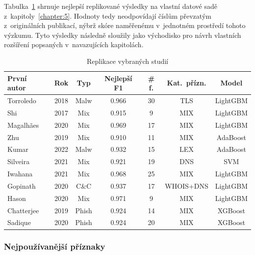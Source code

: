 Tabulka~\ref{tab:method_comparison_intext} shrnuje nejlepší replikované výsledky na vlastní datové sadě z~kapitoly~\ref{chapter:5}.  
Hodnoty tedy neodpovídají číslům převzatým z~originálních publikací, nýbrž skóre naměřenému v~jednotném prostředí tohoto výzkumu.  
Tyto výsledky následně sloužily jako východisko pro návrh vlastních rozšíření popsaných v~navazujících kapitolách.


\begin{table}[H]
  \centering
      \begin{tabular}{@{}lcccccc@{}}
        \toprule
        \textbf{První autor} & \textbf{Rok} & \textbf{Typ} &
        \textbf{Nejlepší F1} & \textbf{\# f.} &
        \textbf{Kat.\ přízn.} & \textbf{Model}\\
        \midrule
        Torroledo   & 2018 & Malw   & 0.966 & 30 & TLS           & LightGBM\\
        Shi         & 2017 & Mix    & 0.915 &  9 & MIX           & LightGBM\\
        Magalhães   & 2020 & Mix    & 0.969 & 17 & MIX           & LightGBM\\
        Zhu         & 2019 & Mix    & 0.910 & 11 & MIX           & AdaBoost\\
        Kumar       & 2022 & Malw   & 0.932 & 15 & LEX           & AdaBoost\\
        Silveira    & 2021 & Mix    & 0.921 & 19 & DNS           & SVM\\
        Iwahana     & 2021 & Mix    & 0.968 & 25 & MIX           & LightGBM\\
        Gopinath    & 2020 & C\&C   & 0.937 & 17 & WHOIS+DNS     & LightGBM\\
        Hason       & 2020 & Mix    & 0.971 &  9 & MIX           & LightGBM\\
        Chatterjee  & 2019 & Phish  & 0.924 & 14 & MIX           & XGBoost\\
        Sadique     & 2020 & Phish  & 0.924 & 20 & MIX           & XGBoost\\
        \bottomrule
      \end{tabular}
    \caption{Replikace vybraných studií}
    \label{tab:method_comparison_intext}
\end{table}



\subsubsection{Nejpoužívanější příznaky}

